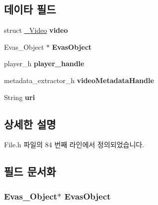 \subsection*{데이타 필드}
\begin{DoxyCompactItemize}
\item 
\hypertarget{struct__VideoExtends_aa5784e2c1293cd9248e7bd28183fc1f8}{struct \hyperlink{struct__Video}{\-\_\-\-Video} {\bfseries video}}\label{struct__VideoExtends_aa5784e2c1293cd9248e7bd28183fc1f8}

\item 
\hypertarget{struct__VideoExtends_ae90b76aa97f5689ba22a80cbf6f95a84}{Evas\-\_\-\-Object $\ast$ {\bfseries Evas\-Object}}\label{struct__VideoExtends_ae90b76aa97f5689ba22a80cbf6f95a84}

\item 
\hypertarget{struct__VideoExtends_acdbf0738be9fa70a60412d48cad881ee}{player\-\_\-h {\bfseries player\-\_\-handle}}\label{struct__VideoExtends_acdbf0738be9fa70a60412d48cad881ee}

\item 
\hypertarget{struct__VideoExtends_a0c761970ca029f0974eadbb58090641c}{metadata\-\_\-extractor\-\_\-h {\bfseries video\-Metadata\-Handle}}\label{struct__VideoExtends_a0c761970ca029f0974eadbb58090641c}

\item 
\hypertarget{struct__VideoExtends_ac0b02717b928a36338653c49b0821365}{String {\bfseries uri}}\label{struct__VideoExtends_ac0b02717b928a36338653c49b0821365}

\end{DoxyCompactItemize}


\subsection{상세한 설명}


File.\-h 파일의 84 번째 라인에서 정의되었습니다.



\subsection{필드 문서화}
\hypertarget{struct__VideoExtends_ae90b76aa97f5689ba22a80cbf6f95a84}{
\subsubsection[{Evas\-Object}]{\setlength{\rightskip}{0pt plus 5cm}Evas\-\_\-\-Object$\ast$ Evas\-Object}}\label{struct__VideoExtends_ae90b76aa97f5689ba22a80cbf6f95a84}


